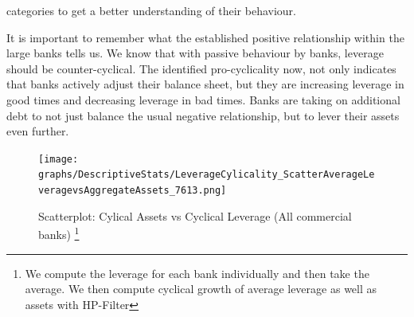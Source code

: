 \documentclass[12pt, a4paper]{article} %
\begin{document}
categories to get a better understanding of their behaviour.

It is important to remember what the established positive relationship within the large banks tells us. We know that with passive behaviour by banks, leverage should be counter-cyclical. The identified pro-cyclicality now, not only indicates that banks actively adjust their balance sheet, but they are increasing leverage in good times and decreasing leverage in bad times. Banks are taking on additional debt to not just balance the usual negative relationship, but to lever their assets even further.


\begin{figure}[H]
\begin{minipage}{\textwidth}
\centering
\caption[1]{Scatterplot: Cylical Assets vs Cyclical Leverage (All commercial banks) \footnote{We compute the leverage for each bank individually and then take the average. We then compute cyclical growth of average leverage as well as assets with HP-Filter}}
\texttt{[image: graphs/DescriptiveStats/LeverageCylicality\_ScatterAverageLeveragevsAggregateAssets\_7613.png]}
\label{fig:ScatterCyclicalLeverageAssets}
\end{minipage}
\end{figure}
\end{document}
